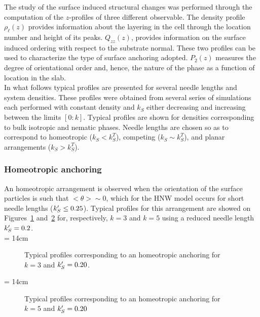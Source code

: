 The study of the surface induced structural changes was performed through the computation of 
the $z$-profiles of three different observable.
The density profile $\rho_\ell(z)$ provides information about the layering in the cell 
through the location number and height of its peaks. $Q_{zz}(z)$, provides information 
on the surface induced ordering with respect to the substrate normal. These two profiles can be 
used to characterize the type of surface anchoring adopted. $P_2(z)$ measures the degree 
of orientational order and, hence, the nature of the phase as a function of location in the slab.\\
%
In what follows typical profiles are presented for several needle lengths and system densities. 
These profiles were obtained from several series of simulations each performed with constant density 
and $k_S$ either decreasing and increasing between the limits $[0:k]$.
Typical profiles are shown for densities corresponding to bulk isotropic  and nematic phases. 
Needle lengths are chosen so as to correspond to homeotropic 
($k_S<k^T_S$), competing ($k_S\sim k^T_S$), and planar arrangements ($k_S>k^T_S$).


\subsubsection{Homeotropic anchoring}

An homeotropic arrangement is observed when the orientation of the surface
particles is such that $<\theta>\sim 0$, which for the HNW model occurs for short needle
lengths ($k_S^{\prime} \leq 0.25$). Typical profiles for this arrangement are showed on
Figures~\ref{fig:typicalProfile_k3_homeo} and~\ref{fig:typicalProfile_k5_homeo} for,
respectively, $k=3$ and $k=5$ using a reduced needle length $k_S^{\prime} = 0.2$.\\
%
\picW = 14cm
\begin{figure}
        \centering
	\caption{Typical profiles corresponding to an homeotropic anchoring for $k=3$ 
	and $k_S^{\prime} = 0.20$.}
	\label{fig:typicalProfile_k3_homeo}
\end{figure}
%
\picW = 14cm
\begin{figure}
        \centering
	\caption{Typical profiles corresponding to an homeotropic anchoring for $k=5$ 
	and $k_S^{\prime} = 0.20$}
	\label{fig:typicalProfile_k5_homeo}
\end{figure}

